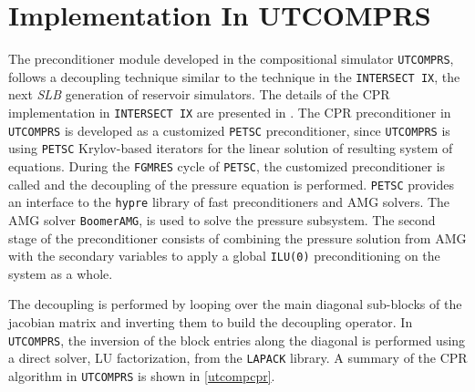 \chapter{Implementation In UTCOMPRS}
The preconditioner module developed in the compositional simulator \texttt{UTCOMPRS}, follows a
decoupling technique similar to the technique in the \texttt{INTERSECT IX}, the next \textit{SLB}
generation of reservoir simulators. The details of the CPR implementation in \texttt{INTERSECT IX}
are presented in \cite{ix-cpr}. The CPR preconditioner in \texttt{UTCOMPRS} is developed as a customized
\texttt{PETSC} preconditioner, since \texttt{UTCOMPRS} is using \texttt{PETSC} Krylov-based iterators 
for the linear solution of resulting system of equations. During the \texttt{FGMRES} cycle of \texttt{PETSC}, 
the customized preconditioner is called and the decoupling of the pressure equation is performed. \texttt{PETSC}
provides an interface to the \texttt{hypre} library of fast preconditioners and AMG solvers\supercite{hypre}.
The AMG solver \texttt{BoomerAMG}\supercite{boomeramg}, is used to solve the pressure subsystem. The second stage
of the preconditioner consists of combining the pressure solution from AMG with the secondary variables to apply
a global \texttt{ILU(0)} preconditioning on the system as a whole. 

The decoupling is performed by looping over the main diagonal sub-blocks of the jacobian matrix 
and inverting them to build the decoupling operator. In \texttt{UTCOMPRS}, the inversion
of the block entries along the diagonal is performed using a direct solver, LU factorization, 
from the \texttt{LAPACK} library. A summary of the CPR algorithm in \texttt{UTCOMPRS} is shown in \ref{utcompcpr}.




